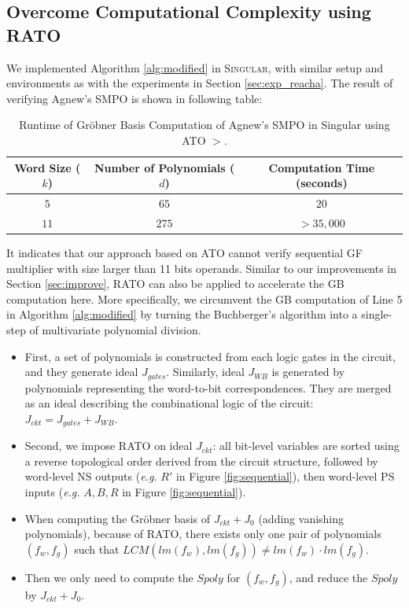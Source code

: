 \subsection{Overcome Computational Complexity using RATO}
We implemented Algorithm \ref{alg:modified} in \textsc{Singular}, with similar setup and environments as
with the experiments in Section \ref{sec:exp_reacha}. The result of verifying Agnew's SMPO is shown 
in following table:

\begin{table}[H]
\label{tab:slimgb}
	\begin{center}
	    \caption{Runtime of Gr\"obner Basis Computation of Agnew's SMPO in Singular using ATO $>$.}\label{tab:ATO}
	    \begin{tabular}{|c|c||c|} 
	        \hline
		Word Size ($k$) & Number of Polynomials ($d$) & Computation Time (seconds)   \\
		\hline
	        $5$	&  $65$  & $20$ \\
		$11$	&  $275$  & $>35,000$  \\
	        \hline
	    \end{tabular}
	\end{center} 
\end{table}

It indicates that our approach based on ATO cannot verify sequential GF multiplier with size larger than 11 bits operands.
Similar to our improvements in Section \ref{sec:improve}, RATO \cite{TimDAC} can also be applied to 
accelerate the GB computation here. More specifically, we circumvent the GB computation 
of Line 5 in Algorithm \ref{alg:modified} by turning the Buchberger's algorithm 
into a single-step of multivariate polynomial division.

\begin{itemize}
\item First, a set of polynomials is constructed from each logic gates in the circuit, and they generate 
ideal $J_{gates}$. Similarly, ideal $J_{WB}$ is generated by polynomials representing the word-to-bit correspondences.
They are merged as an ideal describing the combinational logic of the circuit: $J_{ckt} = J_{gates} + J_{WB}$.
\item Second, we impose RATO on ideal $J_{ckt}$: all bit-level variables are sorted using a reverse topological order
derived from the circuit structure, followed by word-level NS outputs ({\it e.g.} $R'$ in Figure \ref{fig:sequential}), 
then word-level PS inputs ({\it e.g.} $A,B,R$ in Figure \ref{fig:sequential}).
\item When computing the Gr\"obner basis of $J_{ckt}+J_0$ (adding vanishing polynomials), because of 
RATO, there exists only one pair of polynomials $(f_w,f_g)$ such that $LCM(lm(f_w),lm(f_g)) \neq lm(f_w)\cdot lm(f_g)$.
\item Then we only need to compute the $Spoly$ for $(f_w,f_g)$, and reduce the $Spoly$ by $J_{ckt}+J_0$.
\end{itemize}

